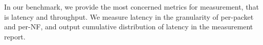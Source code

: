 In our benchmark, we provide the most concerned metrics for measurement,
that is latency and throughput.
We measure latency in the granularity of per-packet and per-NF,
and output cumulative distribution of latency in the measurement report.


%
%
